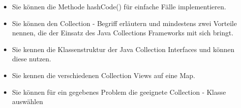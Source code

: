 \begin{itemize}
  \item Sie können die Methode hashCode() für einfache Fälle implementieren. \\

  \item Sie können den Collection - Begriff erläutern und mindestens zwei Vorteile nennen, die der Einsatz des Java Collections Frameworks mit sich bringt. \\

  \item Sie kennen die Klassenstruktur der Java Collection Interfaces und können diese nutzen. \\

  \item Sie kennen die verschiedenen Collection Views auf eine Map. \\

  \item Sie können für ein gegebenes Problem die geeignete Collection - Klasse auswählen \\
\end{itemize}
